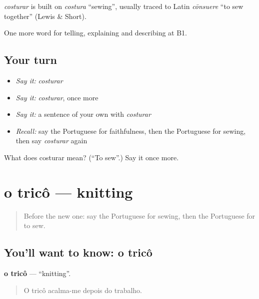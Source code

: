 \begin{cousinweb}
\emph{costurar} is built on \emph{costura} \textquotedblleft{}sewing\textquotedblright{}, usually traced to Latin \emph{cōnsuere} \textquotedblleft{}to sew together\textquotedblright{} (Lewis \& Short).
\end{cousinweb}

\begin{grammarlens}[title={What you've built}]
One more word for telling, explaining and describing at B1.
\end{grammarlens}

\subsection*{Your turn}
\begin{itemize}
\raggedright
  \item \emph{Say it:} \emph{costurar}
  \item \emph{Say it:} \emph{costurar}, once more
  \item \emph{Say it:} a sentence of your own with \emph{costurar}
  \item \emph{Recall:} say the Portuguese for faithfulness, then the Portuguese for sewing, then say \emph{costurar} again
\end{itemize}

\begin{tcolorbox}[breakable,colback=teal!4,colframe=teal!35!black,title={Before you move on}]
What does costurar mean? (\textquotedblleft{}To sew\textquotedblright{}.) Say it once more.
\end{tcolorbox}
\section[o tricô]{o tricô — knitting}

\label{lesson:PT-C500-trico}



\begin{quote}
Before the new one: say the Portuguese for sewing, then the Portuguese for to sew.
\end{quote}

\subsection*{You'll want to know: o tricô}
\textbf{o tricô} — \textquotedblleft{}knitting\textquotedblright{}.

\begin{quote}
O tricô acalma-me depois do trabalho.
\end{quote}

